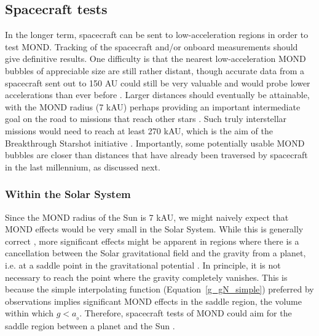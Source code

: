 \documentclass[fleqn,usenatbib,useAMS]{mnras} %
\begin{document}
\subsection{Spacecraft tests}
\label{Spacecraft_tests}

In the longer term, spacecraft can be sent to low-acceleration regions in order to test MOND. Tracking of the spacecraft and/or onboard measurements should give definitive results. One difficulty is that the nearest low-acceleration MOND bubbles of appreciable size are still rather distant, though accurate data from a spacecraft sent out to 150 AU could still be very valuable and would probe lower accelerations than ever before \citep{Berge_2021}. Larger distances should eventually be attainable, with the MOND radius (7 kAU) perhaps providing an important intermediate goal on the road to missions that reach other stars \citep{Heller_2017}. Such truly interstellar missions would need to reach at least 270 kAU, which is the aim of the Breakthrough Starshot initiative \citep{Merali_2016}. Importantly, some potentially usable MOND bubbles are closer than distances that have already been traversed by spacecraft in the last millennium, as discussed next.


\subsubsection{Within the Solar System}
\label{Spacecraft_tests_within_Solar_System}

Since the MOND radius of the Sun is 7 kAU, we might naively expect that MOND effects would be very small in the Solar System. While this is generally correct \citep{Hees_2014, Hees_2016}, more significant effects might be apparent in regions where there is a cancellation between the Solar gravitational field and the gravity from a planet, i.e. at a saddle point in the gravitational potential \citep{Bekenstein_2006}. In principle, it is not necessary to reach the point where the gravity completely vanishes. This is because the simple interpolating function (Equation~\ref{g_gN_simple}) preferred by observations \citep{Iocco_Bertone_2015, Lelli_2017, Banik_2018_Centauri, Chae_2019} implies significant MOND effects in the saddle region, the volume within which $g < a_{_0}$. Therefore, spacecraft tests of MOND could aim for the saddle region between a planet and the Sun \citep[for a review, see][]{Penner_2020}.
\end{document}
